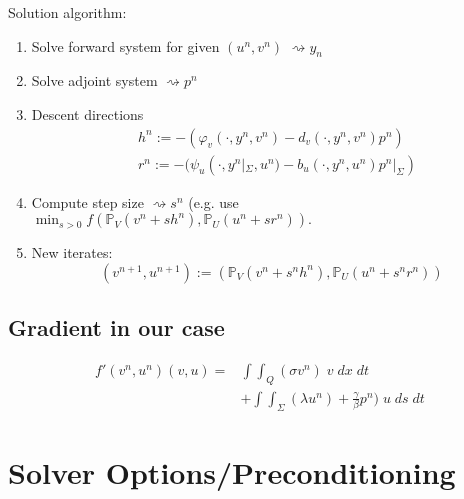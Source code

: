 \documentclass[
12pt, %
a4paper, %
onecolumn, %
portrait %
]{article}
\begin{document}
Solution algorithm:\\
\begin{enumerate}
\item Solve forward system for given $(u^n, v^n)$ $\rightsquigarrow y_n$ \\
\item Solve adjoint system $\rightsquigarrow p^n$ \\
\item Descent directions
\begin{align*}
&h^n := -(\varphi_v(\cdot, y^n, v^n) - d_v(\cdot,y^n,v^n) p^n) \\ 
&r^n := -(\psi_u(\cdot, y^n |_{\Sigma}, u^n) - b_u(\cdot,y^n,u^n) p^n |_{\Sigma})
\end{align*}
\item Compute step size $\rightsquigarrow s^n$
(e.g. use $\min_{s > 0} f(\mathbb{P}_V(v^n+s h^n), \mathbb{P}_U(u^n + s r^n)).$
\item New iterates:
\begin{equation}
(v^{n+1}, u^{n+1}) := (\mathbb{P}_V(v^n + s^n h^n), \mathbb{P}_U(u^n + s^n r^n))
\end{equation}
\end{enumerate}

\subsection{Gradient in our case}
\begin{align*}
f'(v^n, u^n)(v,u) = & \int \int_Q (\sigma v^n) \; v \; dx \; dt \\
& + \int \int_{\Sigma} (\lambda u^n) + \frac{\gamma}{\beta} p^n) \; u \; ds \; dt
\end{align*}

\section{Solver Options/Preconditioning}
\newpage

\renewcommand{\refname}{Reference} %




\end{document}
